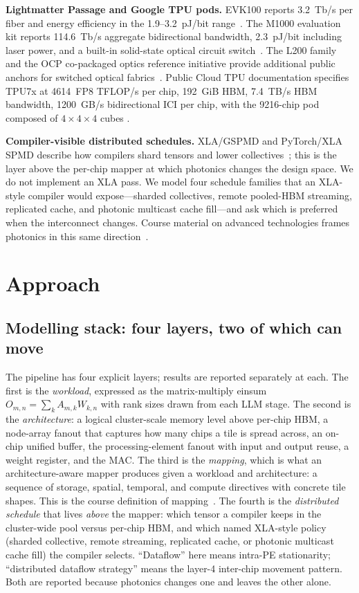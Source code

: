 \documentclass[conference]{IEEEtran}
\newcommand{\pjbit}{pJ/bit}
\newcommand{\tbps}{Tb/s}
\begin{document}
\textbf{Lightmatter Passage and Google TPU pods.}
EVK100 reports 3.2~\tbps{} per fiber and energy efficiency in the
1.9--3.2~\pjbit{} range~\cite{lightmatter-evk100,
lightmatter-passage}. The M1000 evaluation kit reports
114.6~\tbps{} aggregate bidirectional bandwidth, 2.3~\pjbit{}
including laser power, and a built-in solid-state optical circuit
switch~\cite{lightmatter-m1000}. The L200 family and the OCP
co-packaged optics reference initiative provide additional public
anchors for switched optical fabrics~\cite{lightmatter-l200,
lightmatter-ocp,lightmatter-tco}. Public Cloud TPU documentation
specifies TPU7x at 4614~FP8 TFLOP/s per chip, 192~GiB HBM,
7.4~TB/s HBM bandwidth, 1200~GB/s bidirectional ICI per chip, with
the 9216-chip pod composed of $4{\times}4{\times}4$ cubes
\cite{tpu7x,ironwood-blog,hotchips-ironwood}.

\textbf{Compiler-visible distributed schedules.}
XLA/GSPMD and PyTorch/XLA SPMD describe how compilers shard
tensors and lower collectives~\cite{xla-spmd}; this is the layer
above the per-chip mapper at which photonics changes the design
space. We do not implement an XLA pass. We model four schedule
families that an XLA-style compiler would expose---sharded
collectives, remote pooled-HBM streaming, replicated cache, and
photonic multicast cache fill---and ask which is preferred when
the interconnect changes. Course material on advanced
technologies frames photonics in this same
direction~\cite{lec11-advtech}.

\section{Approach}
\label{sec:approach}

\subsection{Modelling stack: four layers, two of which can move}
The pipeline has four explicit layers; results are reported
separately at each. The first is the \emph{workload}, expressed as
the matrix-multiply einsum $O_{m,n}=\sum_k A_{m,k} W_{k,n}$ with
rank sizes drawn from each LLM stage. The second is the
\emph{architecture}: a logical cluster-scale memory level above
per-chip HBM, a node-array fanout that captures how many chips a
tile is spread across, an on-chip unified buffer, the
processing-element fanout with input and output reuse, a weight
register, and the MAC. The third is the \emph{mapping}, which is
what an architecture-aware mapper produces given a workload and
architecture: a sequence of storage, spatial, temporal, and
compute directives with concrete tile shapes. This is the course
definition of mapping~\cite{lec05-mapping}. The fourth is the
\emph{distributed schedule} that lives \emph{above} the mapper:
which tensor a compiler keeps in the cluster-wide pool versus
per-chip HBM, and which named XLA-style policy (sharded
collective, remote streaming, replicated cache, or photonic
multicast cache fill) the compiler selects. ``Dataflow'' here
means intra-PE stationarity; ``distributed dataflow strategy''
means the layer-4 inter-chip movement pattern. Both are reported
because photonics changes one and leaves the other alone.
\end{document}
